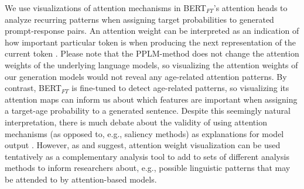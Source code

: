 
We use visualizations of attention mechanisms \citep{vig-2019-multiscale} in BERT$_{FT}$'s attention heads to analyze recurring patterns when assigning target probabilities to generated prompt-response pairs. An attention weight can be interpreted as an indication of how important particular token is when producing the next representation of the current token \citep{DBLP:journals/corr/BahdanauCB14, clark-etal-2019-bert}. Please note that the PPLM-method does not change the attention weights of the underlying language models, so visualizing the attention weights of our generation models would not reveal any age-related attention patterns. By contrast, BERT$_{FT}$ is fine-tuned to detect age-related patterns, so visualizing its attention maps can inform us about which features are important when assigning a target-age probability to a generated sentence. Despite this seemingly natural interpretation, there is much debate about the validity of using attention mechanisms (as opposed to, e.g., saliency methods) as explanations for model output \citep{jain-wallace-2019-attention, wiegreffe-pinter-2019-attention, bastings-filippova-2020-elephant}. However, as \cite{vig-2019-multiscale} and \cite{clark-etal-2019-bert} suggest, attention weight visualization can be used tentatively as a complementary analysis tool to add to sets of different analysis methods to inform researchers about, e.g., possible linguistic patterns that may be attended to by attention-based models.

